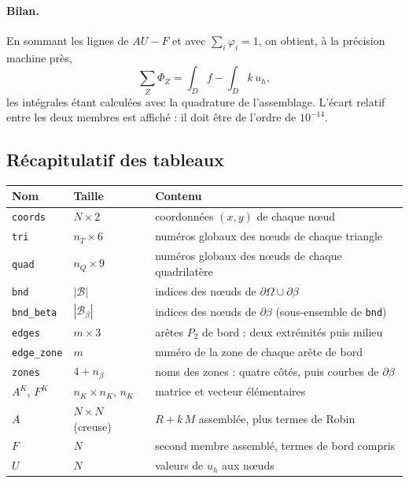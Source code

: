 \documentclass[11pt,a4paper]{article}
\begin{document}
\paragraph{Bilan.} En sommant les lignes de $A U - F$ et avec
$\sum_i \varphi_i = 1$, on obtient, à la précision machine près,
\[
\sum_Z \Phi_Z = \int_D f - \int_D k\, u_h ,
\]
les intégrales étant calculées avec la quadrature de l'assemblage. L'écart
relatif entre les deux membres est affiché : il doit être de l'ordre de
$10^{-14}$.

\subsection{Récapitulatif des tableaux}

\begin{center}
\begin{tabular}{lll}
\hline
Nom & Taille & Contenu \\
\hline
\texttt{coords} & $N \times 2$ & coordonnées $(x,y)$ de chaque nœud \\
\texttt{tri}    & $n_T \times 6$ & numéros globaux des nœuds de chaque triangle \\
\texttt{quad}   & $n_Q \times 9$ & numéros globaux des nœuds de chaque quadrilatère \\
\texttt{bnd}    & $|\mathcal{B}|$ & indices des nœuds de $\partial\Omega \cup \partial\beta$ \\
\texttt{bnd\_beta} & $|\mathcal{B}_\beta|$ & indices des nœuds de $\partial\beta$ (sous-ensemble de \texttt{bnd}) \\
\texttt{edges}  & $m \times 3$ & arêtes $P_2$ de bord : deux extrémités puis milieu \\
\texttt{edge\_zone} & $m$ & numéro de la zone de chaque arête de bord \\
\texttt{zones}  & $4 + n_\beta$ & noms des zones : quatre côtés, puis courbes de $\partial\beta$ \\
$A^K$, $F^K$    & $n_K \times n_K$, $n_K$ & matrice et vecteur élémentaires \\
$A$             & $N \times N$ (creuse) & $R + k\, M$ assemblée, plus termes de Robin \\
$F$             & $N$ & second membre assemblé, termes de bord compris \\
$U$             & $N$ & valeurs de $u_h$ aux nœuds \\
\hline
\end{tabular}
\end{center}
\end{document}
